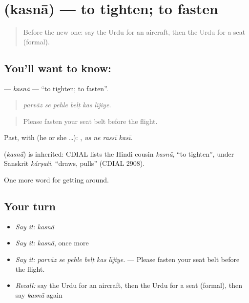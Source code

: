 \section[\texorpdfstring{\ur{کسنا} (kasnā)}{کسنا (kasnā)}]{ (kasnā) — to tighten; to fasten}

\label{lesson:UR-C398-kasna}



\begin{quote}
Before the new one: say the Urdu for an aircraft, then the Urdu for a seat (formal).
\end{quote}

\subsection*{You'll want to know: }
\textbf{} — \emph{kasnā} — \textquotedblleft{}to tighten; to fasten\textquotedblright{}.

\begin{quote}
     
\end{quote}

\begin{quote}
\emph{parvāz se pehle belṭ kas lījiye.}
\end{quote}

\begin{quote}
Please fasten your seat belt before the flight.
\end{quote}

Past, with  (he or she …):    , \emph{us ne rassī kasī}.

\begin{cousinweb}
\textbf{} (\emph{kasnā}) is inherited: CDIAL lists the Hindi cousin \emph{kasnā}, \textquotedblleft{}to tighten\textquotedblright{}, under Sanskrit \emph{kárṣati}, \textquotedblleft{}draws, pulls\textquotedblright{} (CDIAL 2908).
\end{cousinweb}

\begin{grammarlens}[title={What you've built}]
One more word for getting around.
\end{grammarlens}

\subsection*{Your turn}
\begin{itemize}
\raggedright
  \item \emph{Say it:} \emph{kasnā}
  \item \emph{Say it:} \emph{kasnā}, once more
  \item \emph{Say it:} \emph{parvāz se pehle belṭ kas lījiye.} — Please fasten your seat belt before the flight.
  \item \emph{Recall:} say the Urdu for an aircraft, then the Urdu for a seat (formal), then say \emph{kasnā} again
\end{itemize}

